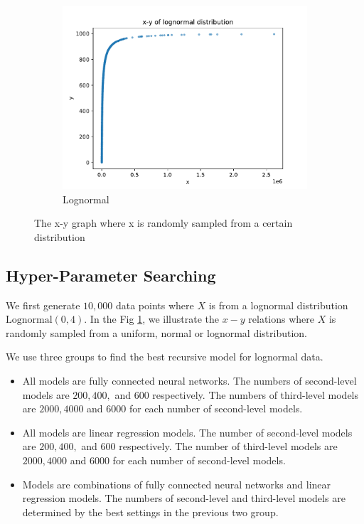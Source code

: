\begin{figure}
\begin{subfigure}[b]{0.3\textwidth}
    	\includegraphics[width=\textwidth]{graphs/evaluation/lognormal.pdf}
    	\caption{Lognormal}
    \end{subfigure}
    \caption{The x-y graph where x is randomly sampled from a certain distribution}
    \label{fig:dist_x_y}
\end{figure}

\subsection{Hyper-Parameter Searching}

We first generate $10,000$ data points where $X$ is from a lognormal distribution $\text{Lognormal}(0, 4)$. In the Fig \ref{fig:dist_x_y}, we illustrate the $x-y$ relations where $X$ is randomly sampled from a uniform, normal or lognormal distribution.

We use three groups to find the best recursive model for lognormal data.
\begin{itemize}
	\item All models are fully connected neural networks. The numbers of second-level models are $200, 400,$ and $600$ respectively. The numbers of third-level models are $2000, 4000$ and $6000$ for each number of second-level models.
	\item All models are linear regression models. The number of second-level models are $200, 400,$ and $600$ respectively. The number of third-level models are $2000, 4000$ and $6000$ for each number of second-level models.
	\item Models are combinations of fully connected neural networks and linear regression models. The numbers of second-level and third-level models are determined by the best settings in the previous two group.
\end{itemize}


